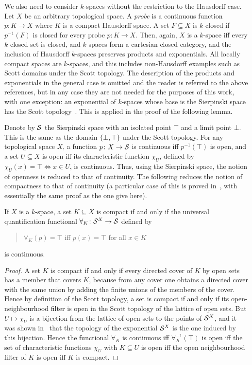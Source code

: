 \documentclass{LMCS}
\begin{document}
We also need to consider $k$-spaces without the restriction to the
Hausdorff case. Let $X$ be an arbitrary topological space. A
\emph{probe} is a continuous function $p \colon K \to X$ where $K$ is
a compact Hausdorff space. A set $F \subseteq X$ is $k$-closed if
$p^{-1}(F)$ is closed for every probe $p \colon K \to X$.  Then,
again, $X$ is a $k$-space iff every $k$-closed set is closed, and
$k$-spaces form a cartesian closed category, and the inclusion of
Hausdorff $k$-spaces preserves products and exponentials.  All locally
compact spaces are $k$-spaces, and this includes non-Hausdorff
examples such as Scott domains under the Scott topology.  The
description of the products and exponentials in the general case is
omitted and the reader is referred to the above references, but in any
case they are not needed for the purposes of this work, with one
exception: an exponential of $k$-spaces whose base is the Sierpinski
space has the Scott topology~\cite{escardo:lawson:simpson}. This is
applied in the proof of the following lemma.

Denote by $\mathcal{S}$ the Sierpinski space with an isolated point $\top$
and a limit point $\bot$. This is the same as the domain
$\{\bot,\top\}$ under the Scott topology. For any topological space
$X$, a function $p \colon X \to \mathcal{S}$ is continuous iff
$p^{-1}(\top)$ is open, and a set $U \subseteq X$ is open iff its
characteristic function $\chi_U$, defined by $\chi_U(x)=\top \iff x
\in U$, is continuous. Thus, using the Sierpinski space, the notion of
openness is reduced to that of continuity.
The following reduces the notion of compactness to that of
continuity (a particular case of this is proved
in~\cite{escardo:barbados}, with essentially the same proof as the one
give here).

\pagebreak[3]
\begin{lem} \label{crucial:generalized}
  If $X$ is a $k$-space, a set $K \subseteq X$ is
  compact if and only if the universal quantification functional
  $\forall_K \colon \mathcal{S}^X \to \mathcal{S}$ defined by
\begin{quote}
$\forall_K(p)=\top$ iff $p(x)=\top$ for all $x \in K$
\end{quote}
is continuous. 
\end{lem}
\begin{proof}
  A set $K$ is compact if and only if every directed cover of $K$ by
  open sets has a member that covers $K$, because from any cover one
  obtains a directed cover with the same union by adding the finite
  unions of the members of the cover.  Hence by definition of the
  Scott topology, a set is compact if and only if its
  open-neighbourhood filter is open in the Scott topology of the
  lattice of open sets.  But $U \mapsto \chi_U$ is a bijection from the
  lattice of open sets to the points of $\mathcal{S}^X$, and it was shown
  in~\cite{escardo:lawson:simpson} that the topology of the
  exponential $\mathcal{S}^X$ is the one induced by this bijection. Hence
  the functional $\forall_K$ is continuous iff $\forall_K^{-1}(\top)$
  is open iff the set of characteristic functions $\chi_U$ with $K
  \subseteq U$ is open iff the open neighbourhood filter of $K$ is
  open iff $K$ is compact.
\end{proof}
\end{document}
